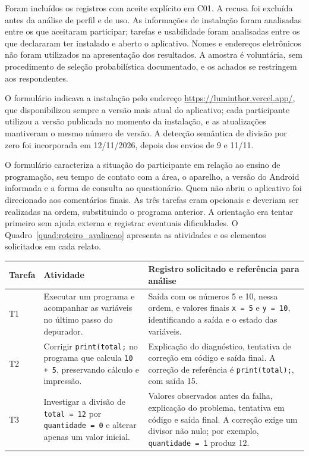 \documentclass[
    12pt
    ,oneside
    ,a4paper
    ,chapter=TITLE
    ,section=TITLE
    ,sumario=abnt-6027-2012]{abntex2}
\renewcommand{\legenda}[2][]{%
    \centering
    \caption[\MakeTextUppercase{#2}]{\maybeLabel{#1}\MakeTextUppercase{#2}}%
}
\begin{document}
Foram incluídos os registros com aceite explícito em C01. A recusa foi excluída antes da
análise de perfil e de uso. As informações de instalação foram analisadas entre os que
aceitaram participar; tarefas e usabilidade foram analisadas entre os que declararam ter
instalado e aberto o aplicativo. Nomes e endereços eletrônicos não foram utilizados na
apresentação dos resultados. A amostra é voluntária, sem procedimento de seleção probabilística
documentado, e os achados se restringem aos respondentes.

O formulário indicava a instalação pelo endereço \url{https://luminthor.vercel.app/},
que disponibilizou sempre a versão mais atual do aplicativo; cada participante
utilizou a versão publicada no momento da instalação, e as atualizações mantiveram
o mesmo número de versão. A detecção semântica de divisão por zero foi incorporada
em 12/11/2026, depois dos envios de 9 e 11/11.

O formulário caracteriza a situação do participante em relação ao ensino de programação,
seu tempo de contato com a área, o aparelho, a versão do Android informada e a forma de
consulta ao questionário. Quem não abriu o aplicativo foi direcionado aos comentários
finais. As três tarefas eram opcionais e deveriam ser realizadas na ordem, substituindo
o programa anterior. A orientação era tentar primeiro sem ajuda externa e registrar
eventuais dificuldades. O Quadro~\ref{quad:roteiro_avaliacao} apresenta as atividades e
os elementos solicitados em cada relato.

\begin{quadro}[htb]
\centering
\legenda[quad:roteiro_avaliacao]{Tarefas práticas do formulário aplicado}
\small
\begin{tabular}{|p{1.2cm}|p{5.6cm}|p{6.6cm}|}
\hline
Tarefa & Atividade & Registro solicitado e referência para análise \\
\hline\hline
T1 & Executar um programa e acompanhar as variáveis no último passo do depurador. & Saída com os números 5 e 10, nessa ordem, e valores finais \texttt{x = 5} e \texttt{y = 10}, identificando a saída e o estado das variáveis. \\
\hline
T2 & Corrigir \texttt{print(total;} no programa que calcula \texttt{10 + 5}, preservando cálculo e impressão. & Explicação do diagnóstico, tentativa de correção em código e saída final. A correção de referência é \texttt{print(total);}, com saída 15. \\
\hline
T3 & Investigar a divisão de \texttt{total = 12} por \texttt{quantidade = 0} e alterar apenas um valor inicial. & Valores observados antes da falha, explicação do problema, tentativa em código e saída final. A correção exige um divisor não nulo; por exemplo, \texttt{quantidade = 1} produz 12. \\
\hline
\end{tabular}
\vspace{0.2cm}
\end{quadro}
\end{document}
